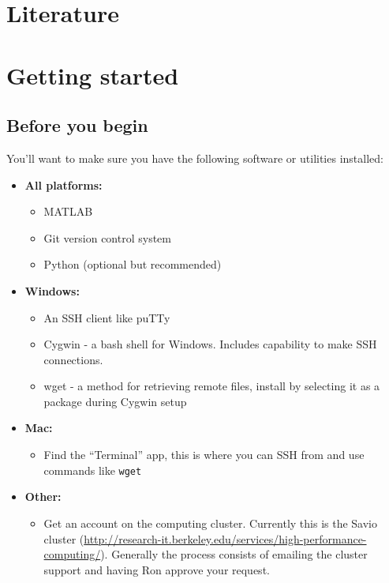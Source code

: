 \documentclass[12pt]{article}
\begin{document}
\section{Literature}

\section{Getting started}
	\subsection{Before you begin}

	You'll want to make sure you have the following software or utilities installed:

	\begin{itemize}
		\item \textbf{All platforms:}
		\begin{itemize}
			\item MATLAB
			\item Git version control system
			\item Python (optional but recommended)
		\end{itemize}
		
		\item \textbf{Windows:}
		\begin{itemize}
			\item An SSH client like puTTy
			\item Cygwin - a bash shell for Windows. Includes capability to make SSH connections.
			\item wget - a method for retrieving remote files, install by selecting it as a package during Cygwin setup
		\end{itemize}
		
		\item \textbf{Mac:}
		\begin{itemize}
			\item Find the ``Terminal'' app, this is where you can SSH from and use commands like \texttt{wget}
		\end{itemize}
		
		\item \textbf{Other:}
		\begin{itemize}
			\item Get an account on the computing cluster. Currently this is the Savio cluster (\url{http://research-it.berkeley.edu/services/high-performance-computing/}). Generally the process consists of emailing the cluster support and having Ron approve your request.
		\end{itemize}
	\end{itemize}
	
\end{document}
